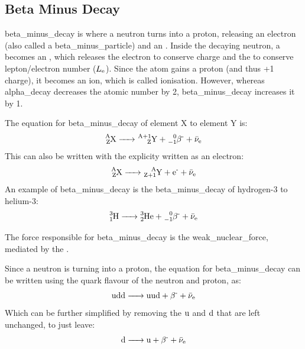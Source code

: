     \subsection{Beta Minus Decay} \label{beta_minus}
        \Gls{beta_minus_decay} is where a \gls{neutron} turns into a \gls{proton}, releasing an \gls{electron} (also called a \gls{beta_minus_particle}) and an .
        Inside the decaying \gls{neutron}, a  becomes an , which releases the \gls{electron} to conserve charge and the  to conserve lepton/electron number ($\leptonnumber[e]$).
        Since the \gls{atom} gains a \gls{proton} (and thus +1 charge), it becomes an \gls{ion}, which is called ionisation.
        However, whereas \gls{alpha_decay} decreases the atomic number by 2, \gls{beta_minus_decay} increases it by 1.

        The equation for \gls{beta_minus_decay} of element X to element Y is:
        \begin{equation}
            \ce{_Z^AX -> _Z^{A+1}Y + _{-1}^0{\betaparticle[-]} + {\antineutrino[e]}}
        \end{equation}
        This can also be written with the  explicity written as an \gls{electron}:
        \begin{equation}
            \ce{_Z^AX -> _{Z+1}^AY + {\electron[-]} + {\antineutrino[e]}}
        \end{equation}
        An example of \gls{beta_minus_decay} is the \gls{beta_minus_decay} of hydrogen-3 to helium-3:
        \begin{equation}
            \ce{_1^3H -> _2^3He + _{-1}^0{\betaparticle[-]} + {\antineutrino[e]}}
        \end{equation}

        The force responsible for \gls{beta_minus_decay} is the \gls{weak_nuclear_force}, mediated by the .

        Since a \gls{neutron} is turning into a \gls{proton}, the equation for \gls{beta_minus_decay} can be written using the \gls{quark} flavour of the \gls{neutron} and \gls{proton}, as:
        \begin{equation}
            \ce{{\baryonquarks[udd]} -> {\baryonquarks[uud]} + {\betaparticle[-]} + {\antineutrino[e]}}
        \end{equation}
        Which can be further simplified by removing the $\upquark$ and $\downquark$ that are left unchanged, to just leave:
        \begin{equation}
            \ce{{\downquark} -> {\upquark} + {\betaparticle[-]} + {\antineutrino[e]}}
        \end{equation}

